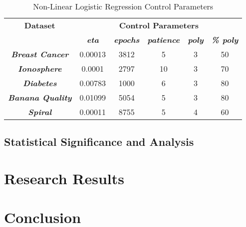 \documentclass[10pt, conference]{IEEEtran}
\begin{document}
\begin{table}[h!]
    \caption{Non-Linear Logistic Regression Control Parameters}
    \begin{center}
        \begin{tabular}{|c||c|c|c|c|c|}
            \hline
            \textbf{Dataset}&\multicolumn{5}{|c|}{\textbf{Control Parameters}} \\
            \cline{2-6}
                        & \textbf{\textit{eta}} & \textbf{\textit{epochs}} & \textbf{\textit{patience}} & \textbf{\textit{poly}} & \textbf{\textit{\% poly}}\\
            \hline
            \textbf{\textit{Breast Cancer}} & 0.00013 & 3812 & 5 & 3 & 50\\
            \textbf{\textit{Ionosphere}} & 0.0001 & 2797 & 10 & 3 & 70\\
            \textbf{\textit{Diabetes}} & 0.00783 & 1000 & 6 & 3 & 80\\
            \textbf{\textit{Banana Quality}} & 0.01099 & 5054 & 5 & 3 & 80\\
            \textbf{\textit{Spiral}} & 0.00011 & 8755 & 5 & 4 & 60\\
            \hline
        \end{tabular}
    \end{center}
    \label{table: NLR_control_parameters}
\end{table}

\subsection{Statistical Significance and Analysis}

\section{Research Results} \label{section: Research Results}

\section{Conclusion} \label{section: Conclusion}
\end{document}
